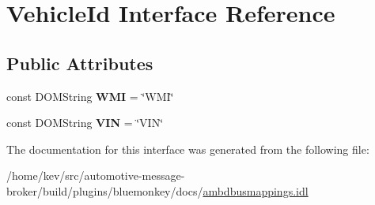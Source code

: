 \hypertarget{interfaceVehicleId}{\section{Vehicle\+Id Interface Reference}
\label{interfaceVehicleId}
}
\subsection*{Public Attributes}
\begin{DoxyCompactItemize}
\item 
\hypertarget{interfaceVehicleId_a975a5877bb5ffd2df7e778af11b741c7}{const D\+O\+M\+String {\bfseries W\+M\+I} = \char`\"{}W\+M\+I\char`\"{}}\label{interfaceVehicleId_a975a5877bb5ffd2df7e778af11b741c7}

\item 
\hypertarget{interfaceVehicleId_aabe466f31c84fcb81c6462ecdcc7ae3c}{const D\+O\+M\+String {\bfseries V\+I\+N} = \char`\"{}V\+I\+N\char`\"{}}\label{interfaceVehicleId_aabe466f31c84fcb81c6462ecdcc7ae3c}

\end{DoxyCompactItemize}


The documentation for this interface was generated from the following file\+:\begin{DoxyCompactItemize}
\item 
/home/kev/src/automotive-\/message-\/broker/build/plugins/bluemonkey/docs/\hyperlink{ambdbusmappings_8idl}{ambdbusmappings.\+idl}\end{DoxyCompactItemize}
